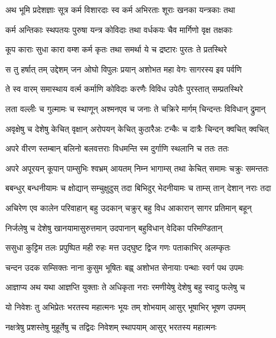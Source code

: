 
\twolineshloka
{अथ भूमि प्रदेशज्ञाः सूत्र कर्म विशारदाः}
{स्व कर्म अभिरताः शूराः खनका यन्त्रकाः तथा} %

\twolineshloka
{कर्म अन्तिकाः स्थपतयः पुरुषा यन्त्र कोविदाः}
{तथा वर्धकयः चैव मार्गिणो वृक्ष तक्षकाः} %

\twolineshloka
{कूप काराः सुधा कारा वम्श कर्म कृतः तथा}
{समर्था ये च द्रष्टारः पुरतः ते प्रतस्थिरे} %

\twolineshloka
{स तु हर्षात् तम् उद्देशम् जन ओघो विपुलः प्रयान्}
{अशोभत महा वेगः सागरस्य इव पर्वणि} %

\twolineshloka
{ते स्व वारम् समास्थाय वर्त्म कर्माणि कोविदाः}
{करणैः विविध उपेतैः पुरस्तात् सम्प्रतस्थिरे} %

\twolineshloka
{लता वल्लीः च गुल्मामः च स्थाणून् अश्मनएव च}
{जनाः ते चक्रिरे मार्गम् चिन्दन्तः विविधान् द्रुमान्} %

\twolineshloka
{अवृक्षेषु च देशेषु केचित् वृक्षान् अरोपयन्}
{केचित् कुठारैअः टन्कैः च दात्रैः चिन्दन् क्वचित् क्वचित्} %

\twolineshloka
{अपरे वीरण स्तम्बान् बलिनो बलवत्तराः}
{विधमन्ति स्म दुर्गाणि स्थलानि च ततः ततः} %

\twolineshloka
{अपरे अपूरयन् कूपान् पाम्सुभिः श्वभ्रम् आयतम्}
{निम्न भागाम्स् तथा केचित् समामः चक्रुः समन्ततः} %

\twolineshloka
{बबन्धुर् बन्धनीयामः च क्षोद्यान् सम्चुक्षुदुस् तदा}
{बिभिदुर् भेदनीयामः च ताम्स् तान् देशान् नराः तदा} %

\twolineshloka
{अचिरेण एव कालेन परिवाहान् बहु उदकान्}
{चक्रुर् बहु विध आकारान् सागर प्रतिमान् बहून्} %

\twolineshloka
{निर्जलेषु च देशेषु खानयामासुरुत्तमान्}
{उदपानान् बहुविधान् वेदिका परिमण्डितान्} %

\twolineshloka
{ससुधा कुट्टिम तलः प्रपुष्पित मही रुहः}
{मत्त उद्घुष्ट द्विज गणः पताकाभिर् अलम्कृतः} %

\twolineshloka
{चन्दन उदक सम्सिक्तः नाना कुसुम भूषितः}
{बह्व् अशोभत सेनायाः पन्थाः स्वर्ग पथ उपमः} %

\twolineshloka
{आज्ञाप्य अथ यथा आज्ञप्ति युक्ताः ते अधिकृता नराः}
{रमणीयेषु देशेषु बहु स्वादु फलेषु च} %

\twolineshloka
{यो निवेशः तु अभिप्रेतः भरतस्य महात्मनः}
{भूयः तम् शोभयाम् आसुर् भूषाभिर् भूषण उपमम्} %

\twolineshloka
{नक्षत्रेषु प्रशस्तेषु मुहूर्तेषु च तद्विदः}
{निवेशम् स्थापयाम् आसुर् भरतस्य महात्मनः} %


